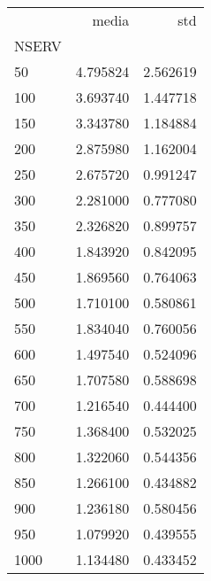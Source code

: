 \begin{tabular}{lrr}
\toprule
{} &     media &       std \\
NSERV &           &           \\
\midrule
50    &  4.795824 &  2.562619 \\
100   &  3.693740 &  1.447718 \\
150   &  3.343780 &  1.184884 \\
200   &  2.875980 &  1.162004 \\
250   &  2.675720 &  0.991247 \\
300   &  2.281000 &  0.777080 \\
350   &  2.326820 &  0.899757 \\
400   &  1.843920 &  0.842095 \\
450   &  1.869560 &  0.764063 \\
500   &  1.710100 &  0.580861 \\
550   &  1.834040 &  0.760056 \\
600   &  1.497540 &  0.524096 \\
650   &  1.707580 &  0.588698 \\
700   &  1.216540 &  0.444400 \\
750   &  1.368400 &  0.532025 \\
800   &  1.322060 &  0.544356 \\
850   &  1.266100 &  0.434882 \\
900   &  1.236180 &  0.580456 \\
950   &  1.079920 &  0.439555 \\
1000  &  1.134480 &  0.433452 \\
\bottomrule
\end{tabular}
